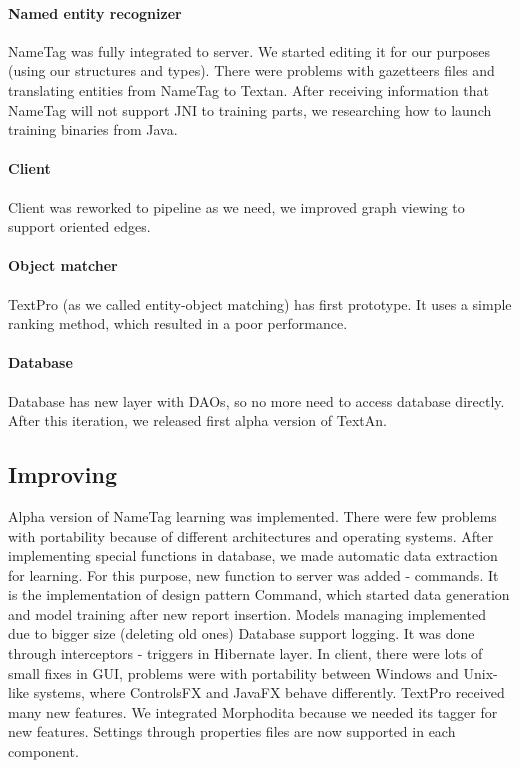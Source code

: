\paragraph{Named entity recognizer} NameTag was fully integrated to server. We 
started editing it for our purposes (using our structures and types). There were
problems with gazetteers files and translating entities from NameTag to Textan.
After receiving information that NameTag will not support JNI to training parts,
 we researching how to launch training binaries from Java.
\paragraph{Client} Client was reworked to pipeline as we need, we improved graph
 viewing to support oriented edges.
\paragraph{Object matcher} TextPro (as we called entity-object matching) has first
 prototype. It uses a simple ranking method, which resulted in a poor performance. 
\paragraph{Database} Database has new layer with DAOs, so no more need to access
database directly. After this iteration, we released first alpha version of TextAn.

\subsection{Improving}
Alpha version of NameTag learning was implemented. There were few problems with
portability because of different architectures and operating systems. After
implementing special functions in database, we made automatic data extraction for
learning. For this purpose, new function to server was added - commands. It is
the implementation of design pattern Command, which started data generation and
model training after new report insertion. Models managing implemented due to
bigger size (deleting old ones) Database support logging. It was done through
interceptors - triggers in Hibernate layer. In client, there were lots of small
fixes in GUI, problems were with portability between Windows and Unix-like systems,
where ControlsFX and JavaFX behave differently. TextPro received many new features.
We integrated Morphodita because we needed its tagger for new features.
Settings through properties files are now supported in each component.

